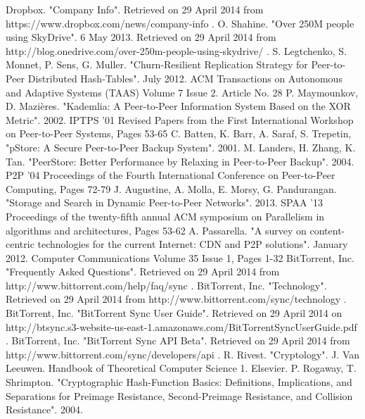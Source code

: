 \documentclass[12pt]{report}
\begin{document}
\begin{thebibliography}{11}

 Dropbox. "Company Info". Retrieved on 29 April 2014 from https://www.dropbox.com/news/company-info .
 O. Shahine. "Over 250M people using SkyDrive". 6 May 2013. Retrieved on 29 April 2014 from http://blog.onedrive.com/over-250m-people-using-skydrive/ .
 S. Legtchenko, S. Monnet, P. Sens, G. Muller. "Churn-Resilient Replication Strategy for Peer-to-Peer Distributed Hash-Tables". July 2012. ACM Transactions on Autonomous and Adaptive Systems (TAAS) Volume 7 Issue 2. Article No. 28
 P. Maymounkov, D. Mazi\`eres. "Kademlia: A Peer-to-Peer Information System Based on the XOR Metric". 2002. IPTPS '01 Revised Papers from the First International Workshop on Peer-to-Peer Systems, Pages 53-65
 C. Batten, K. Barr, A. Saraf, S. Trepetin, "pStore: A Secure Peer-to-Peer Backup System". 2001.
 M. Landers, H. Zhang, K. Tan. "PeerStore: Better Performance by Relaxing in Peer-to-Peer Backup". 2004. P2P '04 Proceedings of the Fourth International Conference on Peer-to-Peer Computing, Pages 72-79
 J. Augustine, A. Molla, E. Morsy, G. Pandurangan. "Storage and Search in Dynamic Peer-to-Peer Networks". 2013. SPAA '13 Proceedings of the twenty-fifth annual ACM symposium on Parallelism in algorithms and architectures, Pages 53-62
 A. Passarella. "A survey on content-centric technologies for the current Internet: CDN and P2P solutions". January 2012. Computer Communications Volume 35 Issue 1, Pages 1-32
 BitTorrent, Inc. "Frequently Asked Questions". Retrieved on 29 April 2014 from http://www.bittorrent.com/help/faq/sync .
 BitTorrent, Inc. "Technology". Retrieved on 29 April 2014 from http://www.bittorrent.com/sync/technology .
 BitTorrent, Inc. "BitTorrent Sync User Guide". Retrieved on 29 April 2014 on http://btsync.s3-website-us-east-1.amazonaws.com/BitTorrentSyncUserGuide.pdf .
 BitTorrent, Inc. "BitTorrent Sync API Beta". Retrieved on 29 April 2014 from http://www.bittorrent.com/sync/developers/api .
 R. Rivest. "Cryptology". J. Van Leeuwen. Handbook of Theoretical Computer Science 1. Elsevier.
 P. Rogaway, T. Shrimpton. "Cryptographic Hash-Function Basics: Definitions, Implications, and Separations for Preimage Resistance, Second-Preimage Resistance, and Collision Resistance". 2004.

\end{thebibliography}
\end{document}
